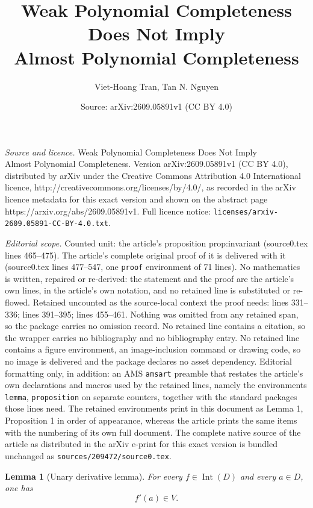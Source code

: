 \documentclass[10pt,a4paper]{amsart}
\title{Weak Polynomial Completeness Does Not Imply \\ Almost Polynomial Completeness}
\author{Viet-Hoang Tran, Tan N. Nguyen}
\date{Source: arXiv:2609.05891v1 (CC BY 4.0)}
\newtheorem{lemma}{Lemma}
\newcommand{\Int}{\operatorname{Int}}
\begin{document}
\maketitle

\noindent\emph{Source and licence.} Weak Polynomial Completeness Does Not Imply \\ Almost Polynomial Completeness. Version arXiv:2609.05891v1 (CC BY 4.0), distributed by arXiv under the Creative Commons Attribution 4.0 International licence, http://creativecommons.org/licenses/by/4.0/, as recorded in the arXiv licence metadata for this exact version and shown on the abstract page https://arxiv.org/abs/2609.05891v1. Full licence notice: \texttt{licenses/arxiv-2609.05891-CC-BY-4.0.txt}.\par\smallskip

\noindent\textit{Editorial scope.} Counted unit: the article's proposition prop:invariant (source0.tex lines 465--475). The article's complete original proof of it is delivered with it (source0.tex lines 477--547, one \texttt{proof} environment of 71 lines). No mathematics is written, repaired or re-derived: the statement and the proof are the article's own lines, in the article's own notation, and no retained line is substituted or re-flowed.  Retained uncounted as the source-local context the proof needs: lines 331--336; lines 391--395; lines 455--461.  Nothing was omitted from any retained span, so the package carries no omission record.  No retained line contains a citation, so the wrapper carries no bibliography and no bibliography entry.  No retained line contains a figure environment, an image-inclusion command or drawing code, so no image is delivered and the package declares no asset dependency.  Editorial formatting only, in addition: an AMS \texttt{amsart} preamble that restates the article's own declarations and macros used by the retained lines, namely the environments \texttt{lemma}, \texttt{proposition} on separate counters, together with the standard packages those lines need.  The retained environments print in this document as Lemma 1, Proposition 1 in order of appearance, whereas the article prints the same items with the numbering of its own full document.  The complete native source of the article as distributed in the arXiv e-print for this exact version is bundled unchanged as \texttt{sources/209472/source0.tex}.
\begin{lemma}[Unary derivative lemma]\label{lem:derivative}
For every \(f\in\Int(D)\) and every \(a\in D\), one has
\[
 f'(a)\in V.
\]
\end{lemma}
\end{document}
